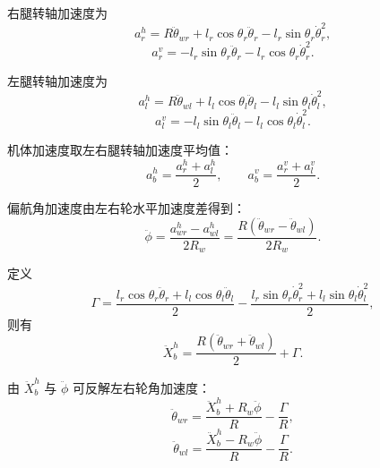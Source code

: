\documentclass[UTF8,a4paper,12pt]{ctexart}
\begin{document}
右腿转轴加速度为
\begin{equation}
    a_r^h =
    R\ddot\theta_{wr}
    + l_r\cos\theta_r \ddot\theta_r
    - l_r\sin\theta_r \dot\theta_r^2,
\end{equation}
\begin{equation}
    a_r^v =
    - l_r\sin\theta_r \ddot\theta_r
    - l_r\cos\theta_r \dot\theta_r^2.
\end{equation}

左腿转轴加速度为
\begin{equation}
    a_l^h =
    R\ddot\theta_{wl}
    + l_l\cos\theta_l \ddot\theta_l
    - l_l\sin\theta_l \dot\theta_l^2,
\end{equation}
\begin{equation}
    a_l^v =
    - l_l\sin\theta_l \ddot\theta_l
    - l_l\cos\theta_l \dot\theta_l^2.
\end{equation}

机体加速度取左右腿转轴加速度平均值：
\begin{equation}
    a_b^h = \frac{a_r^h + a_l^h}{2},
    \qquad
    a_b^v = \frac{a_r^v + a_l^v}{2}.
\end{equation}

偏航角加速度由左右轮水平加速度差得到：
\begin{equation}
    \ddot\phi =
    \frac{a_{wr}^h - a_{wl}^h}{2R_w}
    =
    \frac{R\left(\ddot\theta_{wr} - \ddot\theta_{wl}\right)}{2R_w}.
\end{equation}

定义
\begin{equation}
    \Gamma =
    \frac{
        l_r\cos\theta_r \ddot\theta_r
        +
        l_l\cos\theta_l \ddot\theta_l
    }{2}
    -
    \frac{
        l_r\sin\theta_r \dot\theta_r^2
        +
        l_l\sin\theta_l \dot\theta_l^2
    }{2},
\end{equation}
则有
\begin{equation}
    \ddot X_b^h =
    \frac{R\left(\ddot\theta_{wr}+\ddot\theta_{wl}\right)}{2}
    + \Gamma.
\end{equation}

由 $\ddot X_b^h$ 与 $\ddot\phi$ 可反解左右轮角加速度：
\begin{equation}
    \ddot\theta_{wr}
    =
    \frac{\ddot X_b^h + R_w\ddot\phi}{R}
    -
    \frac{\Gamma}{R},
\end{equation}
\begin{equation}
    \ddot\theta_{wl}
    =
    \frac{\ddot X_b^h - R_w\ddot\phi}{R}
    -
    \frac{\Gamma}{R}.
\end{equation}
\end{document}
